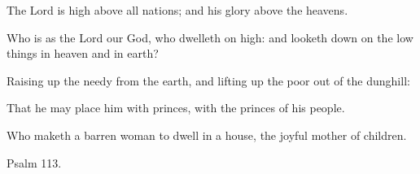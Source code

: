\documentclass[letterpaper,12pt]{article} %
\begin{document}
\begin{parcolumns}[rulebetween,colwidths={1=289pt}]{2}
{\begin{psalmverses}[0]
\item The Lord is high above all nations; and his glory above the heavens.
\item Who is as the Lord our God, who dwelleth on high: and looketh down on the low things in heaven and in earth?
\item Raising up the needy from the earth, and lifting up the poor out of the dunghill:
\item That he may place him with princes, with the princes of his people.
\item Who maketh a barren woman to dwell in a house, the joyful mother of children.
\end{psalmverses}
}
\end{parcolumns}
\medskip
\pagebreak
\medskip

\large
{}
\vspace{-2ex}
\begin{center}{\Large Psalm 113.}\end{center}
\vspace{-1ex}
\normalsize%
\vspace{-1ex}
\end{document}
